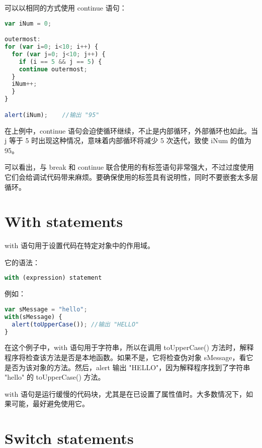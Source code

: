 可以以相同的方式使用 continue 语句：

\begin{lstlisting}[language=JavaScript]
var iNum = 0;

outermost:
for (var i=0; i<10; i++) {
  for (var j=0; j<10; j++) {
    if (i == 5 && j == 5) {
    continue outermost;
  }
  iNum++;
  }
}

alert(iNum);	//输出 "95"
\end{lstlisting}

在上例中，continue 语句会迫使循环继续，不止是内部循环，外部循环也如此。当 j 等于 5 时出现这种情况，意味着内部循环将减少 5 次迭代，致使 iNum 的值为 95。

可以看出，与 break 和 continue 联合使用的有标签语句非常强大，不过过度使用它们会给调试代码带来麻烦。要确保使用的标签具有说明性，同时不要嵌套太多层循环。








\chapter{With statements}


with 语句用于设置代码在特定对象中的作用域。

它的语法：

\begin{lstlisting}[language=JavaScript]
with (expression) statement
\end{lstlisting}

例如：

\begin{lstlisting}[language=JavaScript]
var sMessage = "hello";
with(sMessage) {
  alert(toUpperCase());	//输出 "HELLO"
}
\end{lstlisting}


在这个例子中，with 语句用于字符串，所以在调用 toUpperCase() 方法时，解释程序将检查该方法是否是本地函数。如果不是，它将检查伪对象 sMessage，看它是否为该对象的方法。然后，alert 输出 "HELLO"，因为解释程序找到了字符串 "hello" 的 toUpperCase() 方法。

with 语句是运行缓慢的代码块，尤其是在已设置了属性值时。大多数情况下，如果可能，最好避免使用它。




\chapter{Switch statements}

